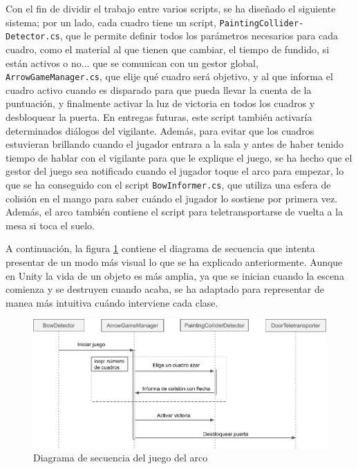 Con el fin de dividir el trabajo entre varios scripts, se ha diseñado el siguiente sistema; por un lado, cada cuadro tiene un script, \texttt{PaintingCollider-} \texttt{Detector.cs}, que le permite definir todos los parámetros necesarios para cada cuadro, como el material al que tienen que cambiar, el tiempo de fundido, si están activos o no... que se comunican con un gestor global, \texttt{ArrowGameManager.cs}, que elije qué cuadro será objetivo, y al que informa el cuadro activo cuando es disparado para que pueda llevar la cuenta de la puntuación, y finalmente activar la luz de victoria en todos los cuadros y desbloquear la puerta. En entregas futuras, este script también activaría determinados diálogos del vigilante. Además, para evitar que los cuadros estuvieran brillando cuando el jugador entrara a la sala y antes de haber tenido tiempo de hablar con el vigilante para que le explique el juego, se ha hecho que el gestor del juego sea notificado cuando el jugador toque el arco para empezar, lo que se ha conseguido con el script \texttt{BowInformer.cs}, que utiliza una esfera de colisión en el mango para saber cuándo el jugador lo sostiene por primera vez. Además, el arco también contiene el script para teletransportarse de vuelta a la mesa si toca el suelo.

A continuación, la figura \ref{fig:sequence-diagram-bow} contiene el diagrama de secuencia que intenta presentar de un modo más visual lo que se ha explicado anteriormente. Aunque en Unity la vida de un objeto es más amplia, ya que se inician cuando la escena comienza y se destruyen cuando acaba, se ha adaptado para representar de manea más intuitiva cuándo interviene cada clase.

\begin{figure}[!h]
\begin{center}
\includegraphics[width=1\textwidth]{imagenes/7/bow-sequence-diagram.png}
\caption{Diagrama de secuencia del juego del arco}
\label{fig:sequence-diagram-bow}
\end{center}
\end{figure}

